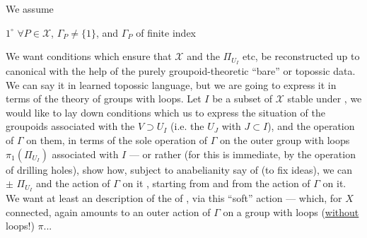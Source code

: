  We assume

\textcircled{\(1^\circ\)} $\forall P\in\mathcal{X}$, $\Gamma_P\ne\{1\}$, and $\Gamma_P$ of finite index  

We want conditions which ensure that $\mathcal{X}$ and the $\Pi_{U_I}$  etc,  be reconstructed up to  canonical  with the help of the purely groupoid-theoretic ``bare'' or topossic   data.  We can say it in learned topossic language, but we are going to express it in terms of the theory of groups with loops. Let $I$ be a subset of $\mathcal{X}$ stable under , we would like to lay down conditions which   us to express  the situation of the groupoids  associated with the $V\supset U_I$ (i.e. the $U_J$ with $J\subset I$),  and the operation of $\Gamma$ on them, in terms of the  sole operation of $\Gamma$ on the outer group with loops  $\pi_1(\Pi_{U_I})$ associated with $I$ ---
\margin{\unsure{$\rightsquigarrow$|$\longrightarrow$}}
or rather (for this is immediate, by the operation of drilling holes),  show how,
subject to anabelianity \unsure{$\zeta$|$\xi$} say of  (to fix ideas), we can $\pm$  $\Pi_{U_I}$ and the action of $\Gamma$ on it ,
starting from   and from the action of $\Gamma$ on it.
We want at least an  description of the  of ,  via
this ``soft'' action --- which, for $X$ connected, again amounts to an outer action of $\Gamma$ on a group with loops (\uline{without} loops!) $\pi$...

